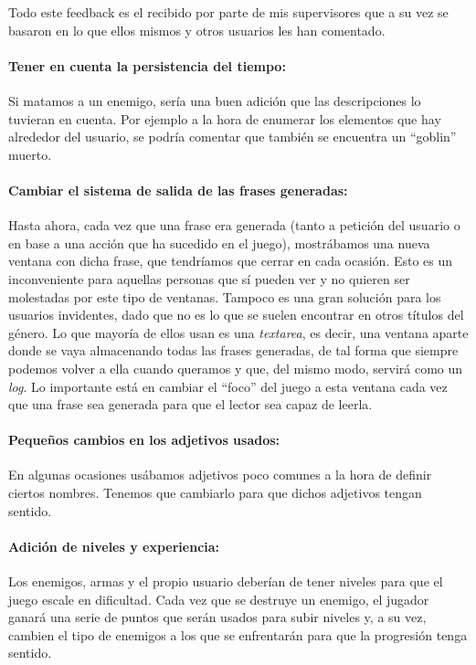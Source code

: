 Todo este feedback es el recibido por parte de mis supervisores que a su vez se basaron en lo que ellos mismos y otros usuarios les han comentado.

\paragraph{Tener en cuenta la persistencia del tiempo:} Si matamos a un enemigo, sería una buen adición que las descripciones lo tuvieran en cuenta. Por ejemplo a la hora de enumerar los elementos que hay alrededor del usuario, se podría comentar que también se encuentra un ``goblin'' muerto.

\paragraph{Cambiar el sistema de salida de las frases generadas:} Hasta ahora, cada vez que una frase era generada (tanto a petición del usuario o en base a una acción que ha sucedido en el juego), mostrábamos una nueva ventana con dicha frase, que tendríamos que cerrar en cada ocasión. Esto es un inconveniente para aquellas personas que sí pueden ver y no quieren ser molestadas por este tipo de ventanas. Tampoco es una gran solución para los usuarios invidentes, dado que no es lo que se suelen encontrar en otros títulos del género. Lo que mayoría de ellos usan es una \textit{textarea}, es decir, una ventana aparte donde se vaya almacenando todas las frases generadas, de tal forma que siempre podemos volver a ella cuando queramos y que, del mismo modo, servirá como un \textit{log}. Lo importante está en cambiar el ``foco'' del juego a esta ventana cada vez que una frase sea generada para que el lector sea capaz de leerla.

\paragraph{Pequeños cambios en los adjetivos usados:} En algunas ocasiones usábamos adjetivos poco comunes a la hora de definir ciertos nombres. Tenemos que cambiarlo para que dichos adjetivos tengan sentido.

\paragraph{Adición de niveles y experiencia:} Los enemigos, armas y el propio usuario deberían de tener niveles para que el juego escale en dificultad. Cada vez que se destruye un enemigo, el jugador ganará una serie de puntos que serán usados para subir niveles y, a su vez, cambien el tipo de enemigos a los que se enfrentarán para que la progresión tenga sentido.

